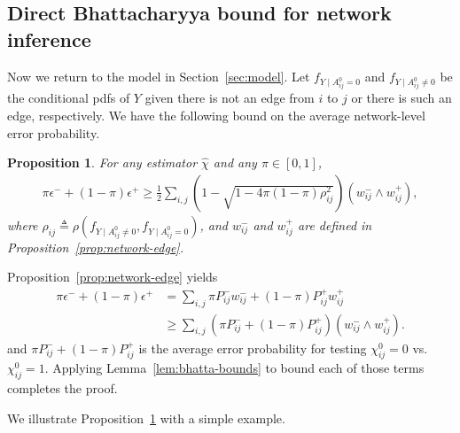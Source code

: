 \documentclass[conference,letterpaper]{IEEEtran}
\newcommand{\defeq}{\triangleq}
\newtheorem{prop}{Proposition}
\newcommand{\trueAdjMat}{A^0}%
\newcommand{\edgeFNR}{P^-}%
\newcommand{\edgeFPR}{P^+}%
\newcommand{\fnrNet}{\epsilon^-}%
\newcommand{\fprNet}{\epsilon^+}%
\newcommand{\trueSuppMat}{\chi^0}%
\newcommand{\suppMatEst}{\widehat\chi}%
\begin{document}
\subsection{Direct Bhattacharyya bound for network inference}
Now we return to the model in Section~\ref{sec:model}.  Let
$f_{Y\mid\trueAdjMat_{ij} = 0}$ and $f_{Y\mid\trueAdjMat_{ij}\neq 0}$
be the conditional pdfs of $Y$ given there is not an edge from $i$ to
$j$ or there is such an edge, respectively.  We have the following
bound on the average network-level error probability.\\[-1em]
\begin{prop}
  \label{prop:bc-mixed}
  For any estimator $\suppMatEst$ and any $\pi\in[0, 1]$,
  {\small
  \begin{align*}
    \label{eq:bc-mixed}
    \pi\fnrNet + (1 - \pi)\fprNet \ge \frac 12\sum_{i, j}\left(1 -
    \sqrt{1 - 4\pi(1-\pi)\rho_{ij}^2}\right)(w_{ij}^-\wedge w_{ij}^+),
  \end{align*}
  }%
  where $\rho_{ij} \defeq\rho(f_{Y\mid\trueAdjMat_{ij} \neq 0},
  f_{Y\mid\trueAdjMat_{ij} = 0})$, and $w_{ij}^-$ and $w_{ij}^+$ are
  defined in Proposition~\ref{prop:network-edge}.
\end{prop}
\begin{IEEEproof}
  Proposition~\ref{prop:network-edge} yields
  \begin{align*}
    \pi\fnrNet + (1-\pi)\fprNet & = \sum_{i, j}\pi\edgeFNR_{ij}w_{ij}^- + (1-\pi)\edgeFPR_{ij}w_{ij}^+\\
    & \ge \sum_{i, j}(\pi\edgeFNR_{ij} + (1-\pi)\edgeFPR_{ij})(w_{ij}^-\wedge w_{ij}^+).
  \end{align*}
  and $\pi\edgeFNR_{ij} + (1-\pi)\edgeFPR_{ij}$ is the average error
  probability for testing $\trueSuppMat_{ij} = 0$ vs.\
  $\trueSuppMat_{ij} = 1$.  Applying Lemma~\ref{lem:bhatta-bounds} to
  bound each of those terms completes the proof.
\end{IEEEproof}
We illustrate Proposition~\ref{prop:bc-mixed} with a simple example.
\end{document}
